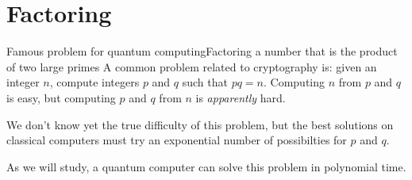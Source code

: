 \section{Factoring}

\begin{frame}{Famous problem for quantum computing}{Factoring a number that is the product of two large primes}
A common problem related to cryptography is: given an integer $n$, compute integers $p$ and $q$ such that $pq=n$.  Computing $n$ from $p$ and $q$ is easy, but computing $p$ and $q$ from $n$ is \emph{apparently} hard.

We don't know yet the true difficulty of this problem, but the best solutions on classical computers must try an exponential number of possibilties for $p$ and $q$.

As we will study, a quantum computer can solve this problem in polynomial time.
\end{frame}